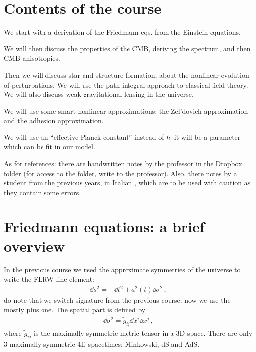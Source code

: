 \documentclass[main.tex]{subfiles}
\begin{document}
\section*{Contents of the course}

We start with a derivation of the Friedmann eqs. from the Einstein equations. 

We will then discuss the properties of the CMB, deriving the spectrum, and then CMB anisotropies. 

Then we will discuss star and structure formation, about the nonlinear evolution of perturbations. 
We will use the path-integral approach to classical field theory. 
We will also discuss weak gravitational lensing in the universe.

We will use some smart nonlinear approximations: the Zel'dovich approximation and the adhesion approximation.

We will use an ``effective Planck constant'' instead of \(\hbar\): it will be a parameter which can be fit in our model. 

As for references: there are handwritten notes by the professor in the Dropbox folder (for access to the folder, write to the professor).
Also, there notes by a student from the previous years, in Italian \cite{nataleNoteCorsoDi2017}, which are to be used with caution as they contain some errors. 




\section{Friedmann equations: a brief overview}


In the previous course we used the approximate symmetries of the universe to write the FLRW line element: 
%
\begin{align}
\dd{s^2} = -\dd{t^2} + a^2(t) \dd{\sigma^2}
\,,
\end{align}
%
do note that we switch signature from the previous course: now we use the mostly plus one.
The spatial part is defined by 
%
\begin{align}
\dd{\sigma^2} = \widetilde{g}_{ij} \dd{x^{i}} \dd{x^{j}}
\,,
\end{align}
%
where \(\widetilde{g}_{ij}\) is the maximally symmetric metric tensor in a 3D space. 
There are only 3 maximally symmetric 4D spacetimes: Minkowski, dS and AdS.
\end{document}
